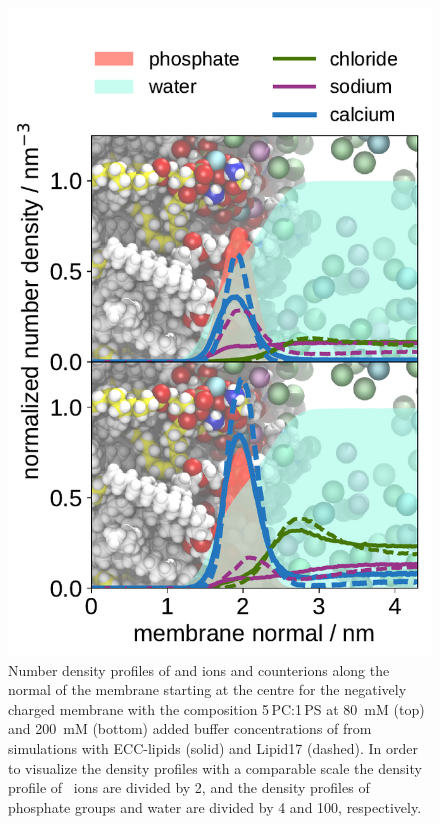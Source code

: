 \documentclass[journal=jpcbfk,manuscript=article]{achemso}
\newlength{\figwidth}
\begin{document}
\begin{figure}[htbp!] 
  \centering 
  \includegraphics[width=\figwidth]{../img/ecc_pops/density_profiles_ca_na_k_cl_wat_phos_ecclipids_lipid17_compar_80and200mMCaCl2.pdf}
  \caption{\label{fig:cacl-dens_PCPS} 
    Number density profiles of  and  ions and  counterions 
    along the normal of the membrane starting at the centre
    for the negatively charged membrane with the composition 5\,PC:1\,PS
    at 80~mM (top) and 200~mM (bottom) added buffer concentrations of  from simulations with ECC-lipids (solid) and Lipid17 (dashed). 
    In order to visualize the density profiles with a comparable scale 
    the density profile of~ ions are divided by 2, and 
    the density profiles of phosphate groups and water are divided by 4 and 100, respectively.  
  }
\end{figure} 
\end{document}
